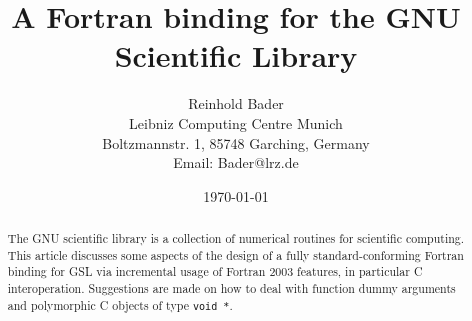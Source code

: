 \documentclass{article}
\begin{document}
\title{A Fortran binding for the GNU Scientific Library}

\author{Reinhold Bader \\ Leibniz Computing Centre Munich \\
    {\small Boltzmannstr. 1, 85748 Garching, Germany } 
    \\ {\small Email: Bader@lrz.de}}

\date{\today}
\maketitle

\begin{abstract}
\noindent The GNU scientific library is a collection of numerical routines for scientific computing.
This article discusses some aspects of the design of a 
fully standard-conforming Fortran binding for
GSL via incremental usage of Fortran 2003
features, in particular C interoperation. Suggestions are made
on  how to deal with
function dummy arguments and polymorphic C objects of type \texttt{void *}.
\end{abstract}
\end{document}
